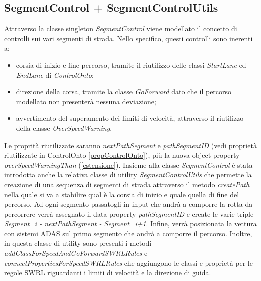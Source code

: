 \subsection{SegmentControl + SegmentControlUtils}
Attraverso la classe singleton \textit{SegmentControl} viene modellato il concetto di controlli sui vari segmenti di strada. Nello specifico, questi controlli sono inerenti a:
\begin{itemize}
\item corsia di inizio e fine percorso, tramite il riutilizzo delle classi \textit{StartLane} ed \textit{EndLane} di \textit{ControlOnto};
\item direzione della corsa, tramite la classe \textit{GoForward} dato che il percorso modellato non presenter\`a nessuna deviazione;
\item avvertimento del superamento dei limiti di velocit\`a, attraverso il riutilizzo della classe \textit{OverSpeedWarning}.
\end{itemize}
Le proprit\`a riutilizzate saranno \textit{nextPathSegment} e \textit{pathSegmentID} (vedi propriet\`a riutilizzate in ControlOnto \ref{propControlOnto}), pi\`u la nuova object property \textit{overSpeedWarningThan} (\ref{estensione}).
Insieme alla classe \textit{SegmentControl} \`e stata introdotta anche la relativa classe di utility \textit{SegmentControlUtils} che permette la creazione di una sequenza di segmenti di strada attraverso il metodo \textit{createPath} nella quale si va a stabilire qual \`e la corsia di inizio e quale quella di fine del percorso.
Ad ogni segmento passatogli in input che andr\`a a comporre la rotta da percorrere verr\`a assegnato il data property \textit{pathSegmentID} e create le varie triple \textit{Segment\_i - nextPathSegment - Segment\_i+1}.
Infine, verr\`a posizionata la vettura con sistemi ADAS sul primo segmento che andr\`a a comporre il percorso.
Inoltre, in questa classe di utility sono presenti i metodi \textit{addClassForSpeedAndGoForwardSWRLRules} e \textit{connectPropertiesForSpeedSWRLRules} che aggiungono le classi e propriet\`a per le regole SWRL riguardanti i limiti di velocit\`a e la direzione di guida.
